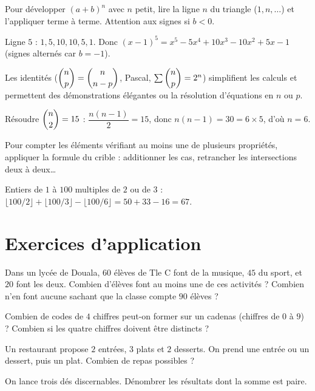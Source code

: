 Pour développer $(a+b)^{n}$ avec $n$ petit, lire la ligne $n$ du triangle ($1,n,\dots$) et l'appliquer terme à terme. Attention aux signes si $b<0$.
\begin{exemple}
Ligne $5$ : $1,5,10,10,5,1$. Donc
$(x-1)^{5}=x^{5}-5x^{4}+10x^{3}-10x^{2}+5x-1$ (signes alternés car $b=-1$).
\end{exemple}

Les identités ($\dbinom np=\dbinom n{n-p}$, Pascal, $\sum\dbinom np=2^n$) simplifient les calculs et permettent des démonstrations élégantes ou la résolution d'équations en $n$ ou $p$.
\begin{exemple}
Résoudre $\dbinom n2=15$ : $\dfrac{n(n-1)}{2}=15$, donc $n(n-1)=30=6\times5$, d'où $n=6$.
\end{exemple}

Pour compter les éléments vérifiant \og au moins une \fg{} de plusieurs propriétés, appliquer
la formule du crible : additionner les cas, retrancher les intersections deux à deux\dots
\begin{exemple}
Entiers de $1$ à $100$ multiples de $2$ ou de $3$ : $\lfloor 100/2\rfloor+\lfloor100/3\rfloor-\lfloor100/6\rfloor=50+33-16=67$.
\end{exemple}

\section{Exercices d'application}

\exo{} Dans un lycée de Douala, $60$ élèves de Tle C font de la musique, $45$ du
sport, et $20$ font les deux. Combien d'élèves font au moins une de ces activités ? Combien
n'en font aucune sachant que la classe compte $90$ élèves ?

\exo{} Combien de codes de $4$ chiffres peut-on former sur un cadenas (chiffres de $0$ à $9$) ? Combien si les quatre chiffres doivent être distincts ?

\exo{} Un restaurant propose $2$ entrées, $3$ plats et $2$ desserts. On prend une entrée ou un dessert, puis un plat. Combien de repas possibles ?

\exo{} On lance trois dés discernables. Dénombrer les résultats dont la somme est paire.

